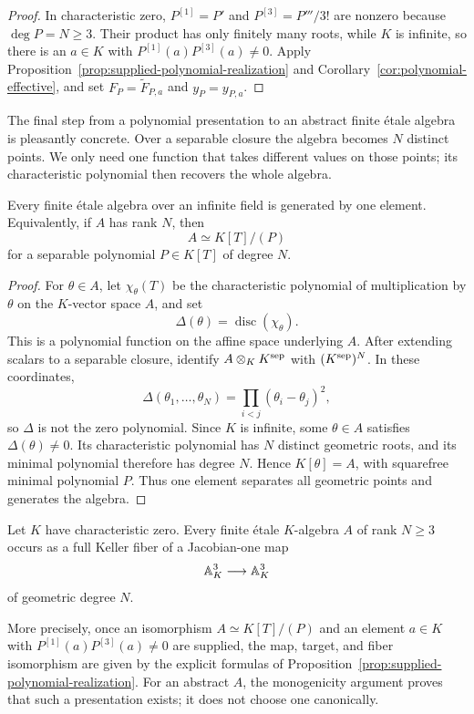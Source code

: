 \begin{proof}
In characteristic zero, \(P^{[1]}=P'\) and
\(P^{[3]}=P'''/3!\) are nonzero because \(\deg P=N\geq3\).
Their product has only finitely many roots, while \(K\) is infinite, so there
is an \(a\in K\) with
\(P^{[1]}(a)P^{[3]}(a)\neq0\).  Apply
Proposition~\ref{prop:supplied-polynomial-realization} and
Corollary~\ref{cor:polynomial-effective}, and set
\(F_P=\widetilde F_{P,a}\) and \(y_P=y_{P,a}\).
\end{proof}

The final step from a polynomial presentation to an abstract finite
\'etale algebra is pleasantly concrete.  Over a separable closure the
algebra becomes \(N\) distinct points.  We only need one function that takes
different values on those points; its characteristic polynomial then
recovers the whole algebra.

\begin{lemma}[Monogenicity]\label{lem:monogenic}
Every finite \'etale algebra over an infinite field is generated by one
element.  Equivalently, if \(A\) has rank \(N\), then
\[
 A\simeq K[T]/(P)
\]
for a separable polynomial \(P\in K[T]\) of degree \(N\).
\end{lemma}

\begin{proof}
For \(\theta\in A\), let \(\chi_\theta(T)\) be the characteristic polynomial
of multiplication by \(\theta\) on the \(K\)-vector space \(A\), and set
\[
 \Delta(\theta)=\operatorname{disc}(\chi_\theta).
\]
This is a polynomial function on the affine space underlying \(A\).  After
extending scalars to a separable closure, identify
\(A\otimes_KK^{\rm sep}\) with \((K^{\rm sep})^N\).  In these coordinates,
\[
 \Delta(\theta_1,\ldots,\theta_N)
 =\prod_{i<j}(\theta_i-\theta_j)^2,
\]
so \(\Delta\) is not the zero polynomial.  Since \(K\) is infinite, some
\(\theta\in A\) satisfies \(\Delta(\theta)\neq0\).  Its characteristic
polynomial has \(N\) distinct geometric roots, and its minimal polynomial
therefore has degree \(N\).  Hence \(K[\theta]=A\), with squarefree minimal
polynomial \(P\).  Thus one element separates all geometric points and
generates the algebra.
\end{proof}

\begin{corollary}
\label{cor:finite-etale-realization}
Let \(K\) have characteristic zero.  Every finite \'etale \(K\)-algebra
\(A\) of rank \(N\geq3\) occurs as a full Keller fiber of a Jacobian-one map
\[
 \mathbb A^3_K\longrightarrow\mathbb A^3_K
\]
of geometric degree \(N\).

More precisely, once an isomorphism \(A\simeq K[T]/(P)\) and an element
\(a\in K\) with \(P^{[1]}(a)P^{[3]}(a)\neq0\) are supplied, the map,
target, and fiber isomorphism are given by the explicit formulas of
Proposition~\ref{prop:supplied-polynomial-realization}.  For an abstract
\(A\), the
monogenicity argument proves that such a presentation exists; it does not
choose one canonically.
\end{corollary}

